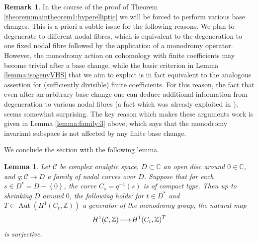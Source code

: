 \documentclass[a4paper,11pt,reqno]{amsart}
\makeatletter
\numberwithin{equation}{section}
\theoremstyle{plain}
\newtheorem{lemma}[theorem]{Lemma}
\theoremstyle{definition}
\newtheorem{remark}[theorem]{Remark}
\newcommand{\Z}{\mathbb Z}
\newcommand{\C}{\mathbb C}
\newcommand{\Aut}{\operatorname{Aut}}
\newcommand{\ca}[1]{{\mathcal{#1}}}
\renewcommand{\longrightarrow}{\xymatrix@1@=15pt{\ar[r]&}}
\newcommand{\set}[1]{\left\{ #1 \right\}}
\makeatother
\begin{document}
\begin{remark} \label{rem:item:family:4}
In the course of the proof of Theorem \ref{theorem:maintheorem1:hyperelliptic} we will be forced to  perform various base changes. This is a priori a subtle issue for the following reasons. 
    We plan to degenerate to different nodal fibres, which is equivalent to the degeneration to one fixed nodal fibre followed by the application of a monodromy operator.
    However, the monodromy action on cohomology with finite coefficients may become trivial after a base change, while the basic criterion in Lemma \ref{lemma:isogenyVHS} that we aim to exploit is in fact equivalent to the analogous assertion for (sufficiently divisible) finite coefficients. 
    For this reason, the fact that even after an arbitrary base change one can deduce additional information from degeneration to various nodal fibres (a fact which was already exploited in \cite{bardellipirola-curvesofgenusg,naranjopirola2018}), seems somewhat surprising.
    The key reason which makes these arguments work is given in Lemma \ref{lemma:family:3}  above, which says that the monodromy invariant subspace is not affected by any finite base change. 
\end{remark}

We conclude the section with the following lemma. 

\begin{lemma} \label{lemma:basechange-surjective-monodromy}
Let $\ca C$ be complex analytic space, $D \subset \C$ an open disc around $0 \in \C$, and $q \colon \ca C \to D$ a family of nodal curves over $D$. Suppose that for each $s \in D^\ast = D - \set{0}$, the curve $C_s = q^{-1}(s)$ is of compact type. Then up to shrinking $D$ around $0$, the following holds: for $t \in D^\ast$ and $T \in \Aut(H^1(C_t,\Z))$ a generator of the monodromy group, the natural map 
\[
H^1(\ca C,\Z) \longrightarrow H^1(C_t,\Z)^T
\]
is surjective. 
\end{lemma}
\end{document}
